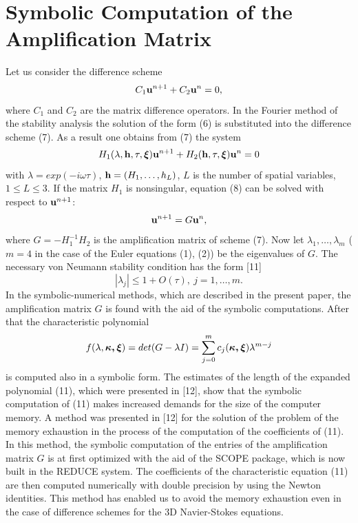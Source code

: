 \section{Symbolic Computation of the Amplification Matrix}
\hspace{6mm}

    Let us consider the difference scheme
\begin{equation}
C_1{\bf u}^{n+1} + C_2{\bf u}^n= 0,
\end{equation}
where $C_1$ and $C_2$ are the matrix difference operators. In the Fourier
method of the stability analysis the solution of the form (6) is substituted
into the difference scheme (7). As a result one obtains from (7) the system
\begin{equation}
H_1(\lambda,{\bf h},\tau,\mbox{\boldmath $\xi$\unboldmath}){\bf u}^{n+1}+
H_2({\bf h},\tau,\mbox{\boldmath $\xi$\unboldmath}){\bf u}^{n} = 0
\end{equation}
with $\lambda=exp(-i\omega\tau)$, ${\bf h}=(H_1,\ldots,h_L)$, $L$ is the number
of spatial variables, $1\leq L\leq 3$. If the matrix $H_1$ is nonsingular,
equation (8) can be solved with respect to ${\bf u}^{n+1}$:
\begin{equation}
{\bf u}^{n+1}=G{\bf u}^n,
\end{equation}
where $G=-H_1^{-1}H_2$ is the amplification matrix of scheme (7). Now let
$\lambda_1,\ldots,\lambda_m$ ($m=4$ in the case of the Euler equations (1),
(2)) be the eigenvalues of $G$. The necessary von Neumann stability condition
has the form [11]
\begin{equation}
|\lambda_j|\leq 1 + O(\tau),~j=1,\ldots,m.
\end{equation}
In the symbolic-numerical methods, which are described in the present paper,
the amplification matrix $G$ is found with the aid of the symbolic
computations. After that the characteristic polynomial
\begin{equation}
f(\lambda,\mbox{\boldmath $\kappa,\xi$\unboldmath})= det(G-\lambda I)
=\sum_{j=0}^mc_j(\mbox{\boldmath $\kappa,\xi$\unboldmath})\lambda^{m-j}
\end{equation}
is computed also in a symbolic form. The estimates of the length of the expanded
polynomial (11), which were presented in [12], show that the symbolic
computation of (11) makes increased demands for the size of the computer
memory. A method was presented in [12] for the solution of the problem of the
memory exhaustion in the process of the computation of the coefficients of
(11). In this method, the symbolic computation of the entries of the
amplification matrix $G$ is at first optimized with the aid of the SCOPE
package, which is now built in the REDUCE system. The coefficients of the
characteristic equation (11) are then computed numerically with double
precision by using the Newton identities. This method has enabled us to avoid
the memory exhaustion even in the case of difference schemes for the 3D
Navier-Stokes equations.

